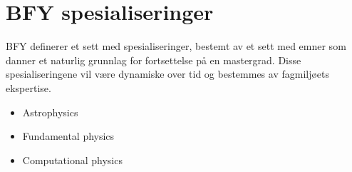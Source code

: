 \chapter{BFY spesialiseringer}
\label{c:bfy-spec}

BFY definerer et sett med spesialiseringer, bestemt av et sett med emner som danner et naturlig grunnlag for fortsettelse på en mastergrad. Disse spesialiseringene vil være dynamiske over tid og bestemmes av fagmiljøets ekspertise.

\begin{itemize}
	\item Astrophysics
	\item Fundamental physics
	\item Computational physics
\end{itemize}